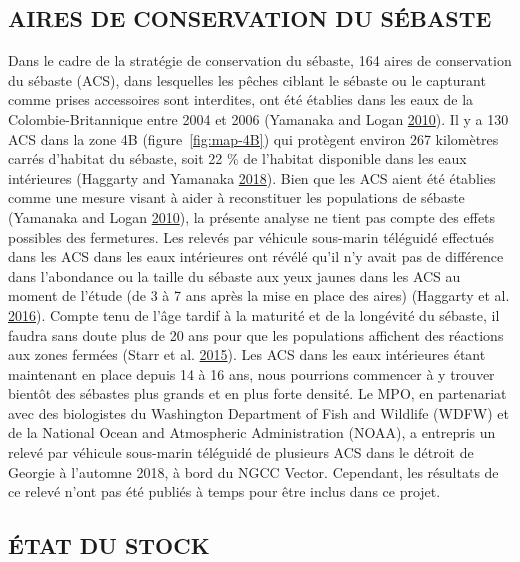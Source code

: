 \documentclass[11pt]{book}
\begin{document}
\hypertarget{sec:discussion-rca}{%
\subsection{AIRES DE CONSERVATION DU SÉBASTE}\label{sec:discussion-rca}}

Dans le cadre de la stratégie de conservation du sébaste, 164 aires de conservation du sébaste (ACS), dans lesquelles les pêches ciblant le sébaste ou le capturant comme prises accessoires sont interdites, ont été établies dans les eaux de la Colombie-Britannique entre 2004 et 2006 (Yamanaka and Logan \protect\hyperlink{ref-yamanaka2010}{2010}). Il y a 130 ACS dans la zone 4B (figure~\ref{fig:map-4B}) qui protègent environ 267 kilomètres carrés d'habitat du sébaste, soit 22 \% de l'habitat disponible dans les eaux intérieures (Haggarty and Yamanaka \protect\hyperlink{ref-haggarty2018}{2018}). Bien que les ACS aient été établies comme une mesure visant à aider à reconstituer les populations de sébaste (Yamanaka and Logan \protect\hyperlink{ref-yamanaka2010}{2010}), la présente analyse ne tient pas compte des effets possibles des fermetures. Les relevés par véhicule sous-marin téléguidé effectués dans les ACS dans les eaux intérieures ont révélé qu'il n'y avait pas de différence dans l'abondance ou la taille du sébaste aux yeux jaunes dans les ACS au moment de l'étude (de 3 à 7 ans après la mise en place des aires) (Haggarty et al. \protect\hyperlink{ref-haggarty2016b}{2016}). Compte tenu de l'âge tardif à la maturité et de la longévité du sébaste, il faudra sans doute plus de 20 ans pour que les populations affichent des réactions aux zones fermées (Starr et al. \protect\hyperlink{ref-starr2015}{2015}). Les ACS dans les eaux intérieures étant maintenant en place depuis 14 à 16 ans, nous pourrions commencer à y trouver bientôt des sébastes plus grands et en plus forte densité. Le MPO, en partenariat avec des biologistes du Washington Department of Fish and Wildlife (WDFW) et de la National Ocean and Atmospheric Administration (NOAA), a entrepris un relevé par véhicule sous-marin téléguidé de plusieurs ACS dans le détroit de Georgie à l'automne 2018, à bord du NGCC Vector. Cependant, les résultats de ce relevé n'ont pas été publiés à temps pour être inclus dans ce projet.

\hypertarget{sec:discussion-status}{%
\subsection{ÉTAT DU STOCK}\label{sec:discussion-status}}
\end{document}
